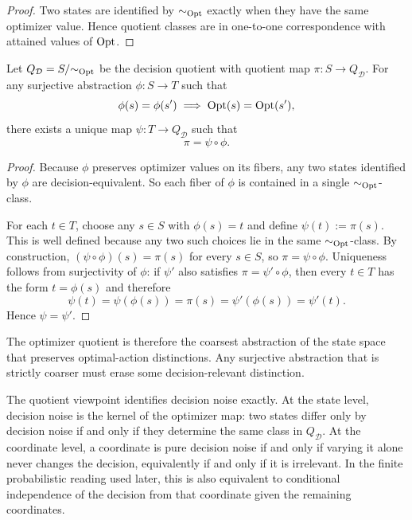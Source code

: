 \begin{proof}
Two states are identified by $\sim_{\mathrm{Opt}}$ exactly when they have the same optimizer value. Hence quotient classes are in one-to-one correspondence with attained values of $\mathrm{Opt}$.
\end{proof}

\begin{theorem}\label{thm:quotient-universal}
Let $Q_{\mathcal{D}}=S/{\sim_{\mathrm{Opt}}}$ be the decision quotient with quotient map $\pi:S\to Q_{\mathcal{D}}$. For any surjective abstraction $\phi:S\to T$ such that
\[
\phi(s)=\phi(s') \implies \mathrm{Opt}(s)=\mathrm{Opt}(s'),
\]
there exists a unique map $\psi:T\to Q_{\mathcal{D}}$ such that
\[
\pi = \psi \circ \phi.
\]
\end{theorem}


\begin{proof}
Because $\phi$ preserves optimizer values on its fibers, any two states identified by $\phi$ are decision-equivalent. So each fiber of $\phi$ is contained in a single $\sim_{\mathrm{Opt}}$-class.

For each $t \in T$, choose any $s \in S$ with $\phi(s)=t$ and define $\psi(t):=\pi(s)$. This is well defined because any two such choices lie in the same $\sim_{\mathrm{Opt}}$-class. By construction, $(\psi\circ\phi)(s)=\pi(s)$ for every $s\in S$, so $\pi=\psi\circ\phi$. Uniqueness follows from surjectivity of $\phi$: if $\psi'$ also satisfies $\pi=\psi'\circ\phi$, then every $t\in T$ has the form $t=\phi(s)$ and therefore
\[
\psi(t)=\psi(\phi(s))=\pi(s)=\psi'(\phi(s))=\psi'(t).
\]
Hence $\psi=\psi'$.
\end{proof}

\begin{remark}\label{rem:quotient-canonical}
The optimizer quotient is therefore the coarsest abstraction of the state space that preserves optimal-action distinctions. Any surjective abstraction that is strictly coarser must erase some decision-relevant distinction.
\end{remark}


\begin{remark}\label{rem:decision-noise}
The quotient viewpoint identifies decision noise exactly. At the state level, decision noise is the kernel of the optimizer map: two states differ only by decision noise if and only if they determine the same class in $Q_{\mathcal{D}}$. At the coordinate level, a coordinate is pure decision noise if and only if varying it alone never changes the decision, equivalently if and only if it is irrelevant. In the finite probabilistic reading used later, this is also equivalent to conditional independence of the decision from that coordinate given the remaining coordinates.
\end{remark}


